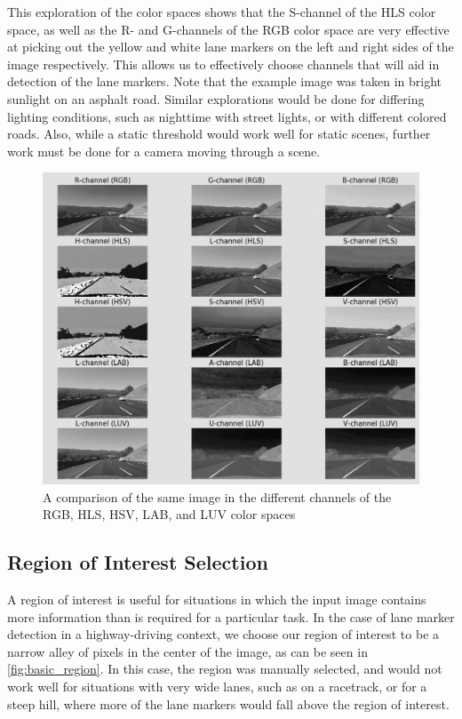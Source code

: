 \documentclass[conf]{new-aiaa}
\begin{document}
This exploration of the color spaces shows that the S-channel of the HLS color space, as well as the R- and G-channels of the RGB color space are very effective at picking out the yellow and white lane markers on the left and right sides of the image respectively.  This allows us to effectively choose channels that will aid in detection of the lane markers.  Note that the example image was taken in bright sunlight on an asphalt road.  Similar explorations would be done for differing lighting conditions, such as nighttime with street lights, or with different colored roads. Also, while a static threshold would work well for static scenes, further work must be done for a camera moving through a scene.

\begin{figure}[h!]
    \centering
    \includegraphics[scale = 0.75]{./images/color_spaces}
    \caption{A comparison of the same image in the different channels of the RGB, HLS, HSV, LAB, and LUV color spaces}
    \label{fig:color_spaces}
\end{figure}

\subsection{Region of Interest Selection}
A region of interest is useful for situations in which the input image contains more information than is required for a particular task.  In the case of lane marker detection in a highway-driving context, we choose our region of interest to be a narrow alley of pixels in the center of the image, as can be seen in \ref{fig:basic_region}.  In this case, the region was manually selected, and would not work well for situations with very wide lanes, such as on a racetrack, or for a steep hill, where more of the lane markers would fall above the region of interest.
\end{document}
